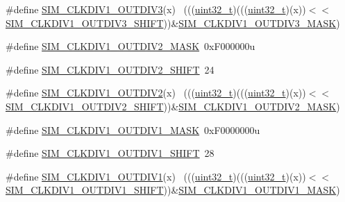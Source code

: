 \begin{DoxyCompactItemize}
\item 
\#define \hyperlink{group___s_i_m___register___masks_gab0713008e430907e25383f8d6039b331}{S\+I\+M\+\_\+\+C\+L\+K\+D\+I\+V1\+\_\+\+O\+U\+T\+D\+I\+V3}(x)                                  ~(((\hyperlink{_p_e___types_8h_a33594304e786b158f3fb30289278f5af}{uint32\+\_\+t})(((\hyperlink{_p_e___types_8h_a33594304e786b158f3fb30289278f5af}{uint32\+\_\+t})(x))$<$$<$\hyperlink{group___s_i_m___register___masks_gab5533e40e65e365a9bb32edf707ac9f0}{S\+I\+M\+\_\+\+C\+L\+K\+D\+I\+V1\+\_\+\+O\+U\+T\+D\+I\+V3\+\_\+\+S\+H\+I\+FT}))\&\hyperlink{group___s_i_m___register___masks_ga0a017e7ea9a2d31e9b23aa2cab06c19d}{S\+I\+M\+\_\+\+C\+L\+K\+D\+I\+V1\+\_\+\+O\+U\+T\+D\+I\+V3\+\_\+\+M\+A\+SK})
\item 
\#define \hyperlink{group___s_i_m___register___masks_gad2d7b5c991f6db7ab2a3e6bc4d9c6aae}{S\+I\+M\+\_\+\+C\+L\+K\+D\+I\+V1\+\_\+\+O\+U\+T\+D\+I\+V2\+\_\+\+M\+A\+SK}~0x\+F000000u
\item 
\#define \hyperlink{group___s_i_m___register___masks_ga6d6fd31143c3871c916062966b6fbc3b}{S\+I\+M\+\_\+\+C\+L\+K\+D\+I\+V1\+\_\+\+O\+U\+T\+D\+I\+V2\+\_\+\+S\+H\+I\+FT}~24
\item 
\#define \hyperlink{group___s_i_m___register___masks_gaf350f750c79647611f0919014ff04037}{S\+I\+M\+\_\+\+C\+L\+K\+D\+I\+V1\+\_\+\+O\+U\+T\+D\+I\+V2}(x)                                  ~(((\hyperlink{_p_e___types_8h_a33594304e786b158f3fb30289278f5af}{uint32\+\_\+t})(((\hyperlink{_p_e___types_8h_a33594304e786b158f3fb30289278f5af}{uint32\+\_\+t})(x))$<$$<$\hyperlink{group___s_i_m___register___masks_ga6d6fd31143c3871c916062966b6fbc3b}{S\+I\+M\+\_\+\+C\+L\+K\+D\+I\+V1\+\_\+\+O\+U\+T\+D\+I\+V2\+\_\+\+S\+H\+I\+FT}))\&\hyperlink{group___s_i_m___register___masks_gad2d7b5c991f6db7ab2a3e6bc4d9c6aae}{S\+I\+M\+\_\+\+C\+L\+K\+D\+I\+V1\+\_\+\+O\+U\+T\+D\+I\+V2\+\_\+\+M\+A\+SK})
\item 
\#define \hyperlink{group___s_i_m___register___masks_ga1bd42e75000e91999a7d8c2f94a9b606}{S\+I\+M\+\_\+\+C\+L\+K\+D\+I\+V1\+\_\+\+O\+U\+T\+D\+I\+V1\+\_\+\+M\+A\+SK}~0x\+F0000000u
\item 
\#define \hyperlink{group___s_i_m___register___masks_ga2d45b701595bf4f2bc6a451508f94c25}{S\+I\+M\+\_\+\+C\+L\+K\+D\+I\+V1\+\_\+\+O\+U\+T\+D\+I\+V1\+\_\+\+S\+H\+I\+FT}~28
\item 
\#define \hyperlink{group___s_i_m___register___masks_gae57b95ee6dc15af2d142e6e1b193383d}{S\+I\+M\+\_\+\+C\+L\+K\+D\+I\+V1\+\_\+\+O\+U\+T\+D\+I\+V1}(x)                                  ~(((\hyperlink{_p_e___types_8h_a33594304e786b158f3fb30289278f5af}{uint32\+\_\+t})(((\hyperlink{_p_e___types_8h_a33594304e786b158f3fb30289278f5af}{uint32\+\_\+t})(x))$<$$<$\hyperlink{group___s_i_m___register___masks_ga2d45b701595bf4f2bc6a451508f94c25}{S\+I\+M\+\_\+\+C\+L\+K\+D\+I\+V1\+\_\+\+O\+U\+T\+D\+I\+V1\+\_\+\+S\+H\+I\+FT}))\&\hyperlink{group___s_i_m___register___masks_ga1bd42e75000e91999a7d8c2f94a9b606}{S\+I\+M\+\_\+\+C\+L\+K\+D\+I\+V1\+\_\+\+O\+U\+T\+D\+I\+V1\+\_\+\+M\+A\+SK})
$$
\end{DoxyCompactItemize}
